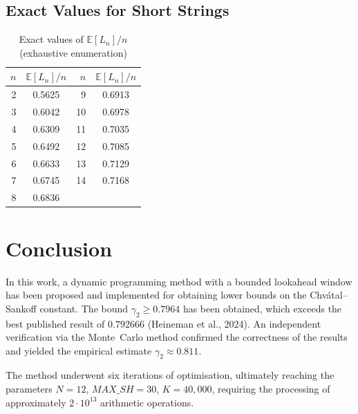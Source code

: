 \documentclass[12pt,a4paper]{article}
\begin{document}
\subsection{Exact Values for Short Strings}
\begin{table}[h]
\centering
\caption{Exact values of $\mathbb{E}[L_n]/n$ (exhaustive enumeration)}
\label{tab:exact}
\begin{tabular}{rc|rc}
  \toprule
  $n$ & $\mathbb{E}[L_n]/n$ & $n$ & $\mathbb{E}[L_n]/n$ \\
  \midrule
  2 & 0.5625 & 9 & 0.6913 \\
  3 & 0.6042 & 10 & 0.6978 \\
  4 & 0.6309 & 11 & 0.7035 \\
  5 & 0.6492 & 12 & 0.7085 \\
  6 & 0.6633 & 13 & 0.7129 \\
  7 & 0.6745 & 14 & 0.7168 \\
  8 & 0.6836 & & \\
  \bottomrule
\end{tabular}
\end{table}
\section{Conclusion}
In this work, a dynamic programming method with a bounded lookahead window has been proposed and implemented for obtaining lower bounds on the Chv\'{a}tal--Sankoff constant.
The bound $\gamma_2 \geq 0.7964$ has been obtained, which exceeds the best published result of $0.792666$ (Heineman et al., 2024).
An independent verification via the Monte~Carlo method confirmed the correctness of the results and yielded the empirical estimate $\gamma_2 \approx 0.811$.

The method underwent six iterations of optimisation, ultimately reaching the parameters $N = 12$, $\mathit{MAX\_SH} = 30$, $K = 40{,}000$, requiring the processing of approximately $2 \cdot 10^{13}$ arithmetic operations.
\end{document}
